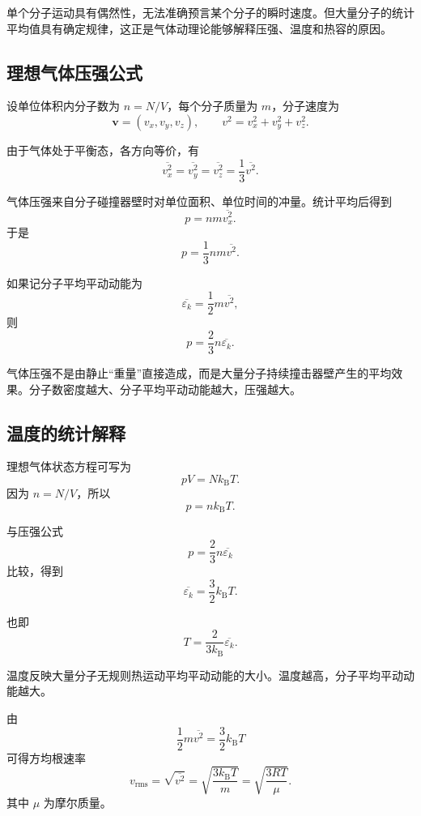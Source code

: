\begin{WarnBox}[微观无规则不等于宏观无规律]
单个分子运动具有偶然性，无法准确预言某个分子的瞬时速度。但大量分子的统计平均值具有确定规律，这正是气体动理论能够解释压强、温度和热容的原因。
\end{WarnBox}

\subsection{理想气体压强公式}

设单位体积内分子数为 \(n=N/V\)，每个分子质量为 \(m\)，分子速度为
\[
  \bm v=(v_x,v_y,v_z),
  \qquad
  v^2=v_x^2+v_y^2+v_z^2.
\]

由于气体处于平衡态，各方向等价，有
\[
  \overline{v_x^2}
  =
  \overline{v_y^2}
  =
  \overline{v_z^2}
  =
  \frac13\overline{v^2}.
\]

气体压强来自分子碰撞器壁时对单位面积、单位时间的冲量。统计平均后得到
\[
  p=nm\overline{v_x^2}.
\]
于是
\[
  \boxed{
  p=\frac13 nm\overline{v^2}
  }.
\]

如果记分子平均平动动能为
\[
  \overline{\varepsilon_k}
  =
  \frac12m\overline{v^2},
\]
则
\[
  \boxed{
  p=\frac23 n\overline{\varepsilon_k}
  }.
\]

\begin{KeyBox}[压强的微观意义]
气体压强不是由静止“重量”直接造成，而是大量分子持续撞击器壁产生的平均效果。分子数密度越大、分子平均平动动能越大，压强越大。
\end{KeyBox}

\subsection{温度的统计解释}

理想气体状态方程可写为
\[
  pV=Nk_{\mathrm B}T.
\]
因为 \(n=N/V\)，所以
\[
  p=nk_{\mathrm B}T.
\]

与压强公式
\[
  p=\frac23n\overline{\varepsilon_k}
\]
比较，得到
\[
  \boxed{
  \overline{\varepsilon_k}=\frac32 k_{\mathrm B}T
  }.
\]

也即
\[
  \boxed{
  T=\frac{2}{3k_{\mathrm B}}\overline{\varepsilon_k}
  }.
\]

\begin{KeyBox}[温度的统计意义]
温度反映大量分子无规则热运动平均平动动能的大小。温度越高，分子平均平动动能越大。
\end{KeyBox}

由
\[
  \frac12m\overline{v^2}=\frac32 k_{\mathrm B}T
\]
可得方均根速率
\[
  \boxed{
  v_{\mathrm{rms}}
  =
  \sqrt{\overline{v^2}}
  =
  \sqrt{\frac{3k_{\mathrm B}T}{m}}
  =
  \sqrt{\frac{3RT}{\mu}}
  }.
\]
其中 \(\mu\) 为摩尔质量。

